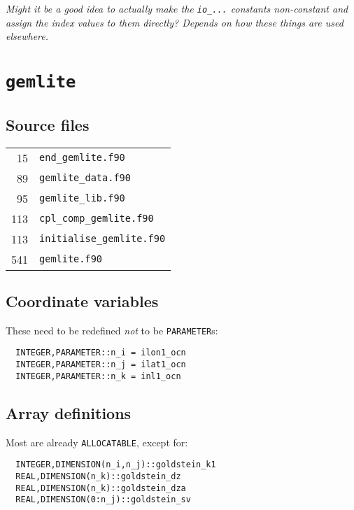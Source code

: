 \documentclass[a4paper,10pt,article]{memoir}
\begin{document}
\emph{Might it be a good idea to actually make the \texttt{io\_...}
  constants non-constant and assign the index values to them
  directly?  Depends on how these things are used elsewhere.}

\chapter{\texttt{gemlite}}

\section{Source files}

\begin{tabular}{rl}
   15 & \texttt{end\_gemlite.f90} \\
   89 & \texttt{gemlite\_data.f90} \\
   95 & \texttt{gemlite\_lib.f90} \\
  113 & \texttt{cpl\_comp\_gemlite.f90} \\
  113 & \texttt{initialise\_gemlite.f90} \\
  541 & \texttt{gemlite.f90} \\
\end{tabular}

\section{Coordinate variables}

These need to be redefined \emph{not} to be \texttt{PARAMETER}s:

\begin{verbatim}
  INTEGER,PARAMETER::n_i = ilon1_ocn
  INTEGER,PARAMETER::n_j = ilat1_ocn
  INTEGER,PARAMETER::n_k = inl1_ocn
\end{verbatim}

\section{Array definitions}

Most are already \texttt{ALLOCATABLE}, except for:

\begin{verbatim}
  INTEGER,DIMENSION(n_i,n_j)::goldstein_k1
  REAL,DIMENSION(n_k)::goldstein_dz
  REAL,DIMENSION(n_k)::goldstein_dza
  REAL,DIMENSION(0:n_j)::goldstein_sv
\end{verbatim}
\end{document}
